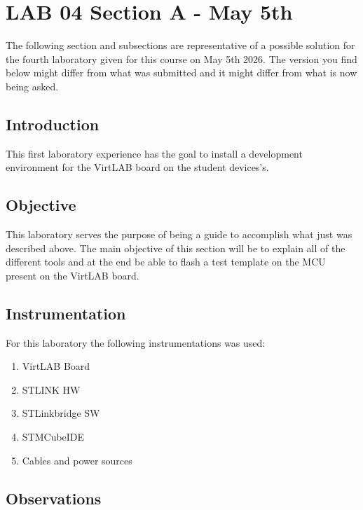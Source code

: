 \documentclass[../main.tex]{subfiles}
\begin{document}
\clearpage
\thispagestyle{empty}

\vspace*{7cm}
\section{LAB 04 Section A - May 5th}
\vspace*{1.5cm}

The following section and subsections are representative of a possible solution for the fourth laboratory given for this course on May 5th 2026.
The version you find below might differ from what was submitted and it might differ from what is now being asked.


\vspace*{1cm}
\subsection{Introduction}


This first laboratory experience has the goal to install a development environment for the VirtLAB board on the student devices's.

\subsection*{Objective}

This laboratory serves the purpose of being a guide to accomplish what just was described above. The main objective of this section will be to explain all of the different tools and at the end be able to flash a test template on the MCU present on the VirtLAB board.\\

\subsection*{Instrumentation}

For this laboratory the following instrumentations was used:

\begin{enumerate}[label=\textbf{-}]
	\item VirtLAB Board
	\item STLINK HW
	\item STLinkbridge SW
	\item STMCubeIDE
	\item Cables and power sources
\end{enumerate}

\subsection*{Observations}
\end{document}
